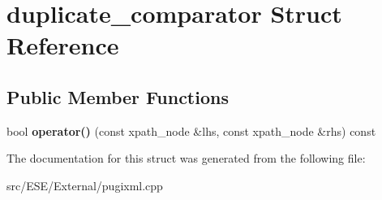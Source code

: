 \hypertarget{structduplicate__comparator}{\section{duplicate\-\_\-comparator Struct Reference}
\label{structduplicate__comparator}
}
\subsection*{Public Member Functions}
\begin{DoxyCompactItemize}
\item 
\hypertarget{structduplicate__comparator_afa36b2cf7af3e0bc7e41b03995bd99d3}{bool {\bfseries operator()} (const xpath\-\_\-node \&lhs, const xpath\-\_\-node \&rhs) const }\label{structduplicate__comparator_afa36b2cf7af3e0bc7e41b03995bd99d3}

\end{DoxyCompactItemize}


The documentation for this struct was generated from the following file\-:\begin{DoxyCompactItemize}
\item 
src/\-E\-S\-E/\-External/pugixml.\-cpp\end{DoxyCompactItemize}
